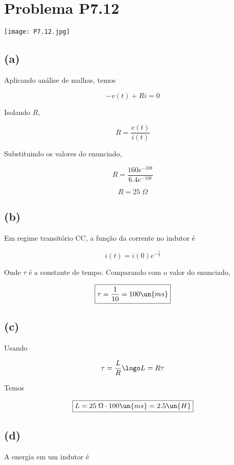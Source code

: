 
\section*{Problema P7.12}

\renewcommand*\thesection{7.12}

\begin{center}
    \texttt{[image: P7.12.jpg]}
\end{center}

\subsection*{(a)}

Aplicando análise de malhas, temos   

\[- v(t) + Ri = 0 \]

Isolando $R$,

\[ R = \frac{v(t)}{i(t)} \]

Substituindo os valores do enunciado,   

\[ R = \frac{160e^{-10t}}{6.4e^{-10t}} \]

\[ \boxed{R = 25 \;\Omega}  \]

\subsection*{(b)}

Em regime transitório CC, a função da corrente no indutor é  

\[ i(t) = i(0)e^{-\frac{t}{\tau}} \]

Onde $\tau$ é a constante de tempo. Comparando com o valor do enunciado,

\[ \boxed{\tau = \frac{1}{10} = 100 \un{ms}}   \]

\subsection*{(c)}

Usando

\[ \tau = \frac{L}{R} \logo L = R\tau \]

Temos  

\[ \boxed{L = 25\;\Omega \cdot 100\un{ms} = 2.5 \un{H}}   \]

\subsection*{(d)}

A energia em um indutor é 


